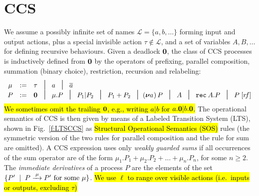 
\section{CCS}
\label{ss:ccs}

We assume a possibly infinite set of names $\mathscr{L} = \{a, b,
\ldots\}$ forming input and $\overline{\mbox{output}}$ actions, plus a special invisible
action $\tau \notin \mathscr{L}$, and a set of variables $A, B,
\ldots$ for defining recursive behaviours.
Given a deadlock ${\boldsymbol 0}$, the class of CCS processes is inductively defined from ${\boldsymbol 0}$ by the operators
of prefixing, parallel composition, summation (binary choice), restriction, recursion and relabeling:
\begin{equation*}
\begin{array}{cccl}
\mu  & := & \tau\!\!\!\! & \midd \; a  \; \midd \;  \outC a  \\
P  & := & \nil\!\!\!\! & \midd \;  \mu . P \; \midd \;  P_1 |  P_2 \; \midd  \;
P_1 + P_2 \; \midd %
  (\res a\!)\, P  \;  \midd \;  A \; \midd \; \recu A  P
\; \midd \; P\; [r\!f]  %
\end{array}
\end{equation*}
\hl{We sometimes omit the trailing ${\boldsymbol 0}$, e.g., writing $a|b$ for $a.{\boldsymbol 0} |b .{\boldsymbol 0}$.}
The operational semantics of CCS is then given by means of
a Labeled Transition System (LTS), shown in Fig.~\ref{f:LTSCCS} as
\hl{Structural Operational Semantics (SOS)}
rules (the symmetric version of the two rules for
parallel composition and the rule for sum are omitted).
A CCS expression uses only \emph{weakly\hl{ }guarded sums} if all occurrences of
the sum operator are of the form $\mu_1.P_1 + \mu_2.P_2 + \ldots
+ \mu_n.P_n$, for some $n \geq 2$.
 The \emph{immediate derivatives} of a
process $P$ are the elements of the set $\{P' \st P \arr\mu P' \mbox{
  for some $\mu$}\}$.
 \hl{We use $\ell$ to range over
  visible actions (i.e.~inputs or outputs, excluding  $\tau$)}

